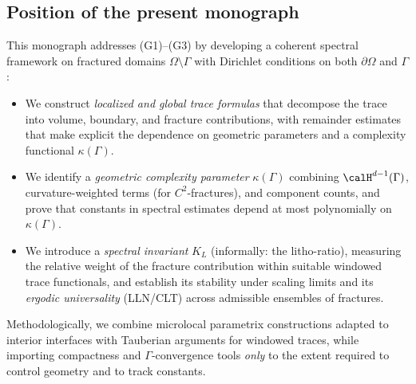 \subsection*{Position of the present monograph}
This monograph addresses (G1)--(G3) by developing a coherent spectral framework on
fractured domains $\Omega\setminus\Gamma$ with Dirichlet conditions on both
$\partial\Omega$ and $\Gamma$:
\begin{itemize}
  \item We construct \emph{localized and global trace formulas} that decompose the trace
  into volume, boundary, and fracture contributions, with remainder estimates that
  make explicit the dependence on geometric parameters and a complexity functional
  $\kappa(\Gamma)$.
  \item We identify a \emph{geometric complexity parameter} $\kappa(\Gamma)$ combining
  $\calH^{d-1}(\Gamma)$, curvature-weighted terms (for $C^2$-fractures), and
  component counts, and prove that constants in spectral estimates depend at most
  polynomially on $\kappa(\Gamma)$.
  \item We introduce a \emph{spectral invariant} $K_L$ (informally: the litho-ratio),
  measuring the relative weight of the fracture contribution within suitable
  windowed trace functionals, and establish its stability under scaling limits and
  its \emph{ergodic universality} (LLN/CLT) across admissible ensembles of fractures.
\end{itemize}
Methodologically, we combine microlocal parametrix constructions adapted to interior
interfaces with Tauberian arguments for windowed traces, while importing compactness
and $\Gamma$-convergence tools \emph{only} to the extent required to control geometry
and to track constants.

